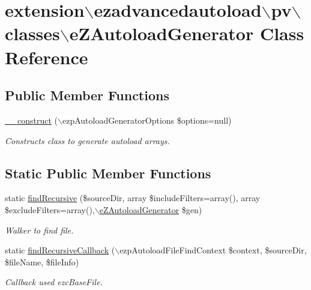 \hypertarget{classextension_1_1ezadvancedautoload_1_1pv_1_1classes_1_1e_z_autoload_generator}{\section{extension$\backslash$ezadvancedautoload$\backslash$pv$\backslash$classes$\backslash$e\-Z\-Autoload\-Generator \-Class \-Reference}
\label{classextension_1_1ezadvancedautoload_1_1pv_1_1classes_1_1e_z_autoload_generator}
}
\subsection*{\-Public \-Member \-Functions}
\begin{DoxyCompactItemize}
\item 
\hyperlink{classextension_1_1ezadvancedautoload_1_1pv_1_1classes_1_1e_z_autoload_generator_ae74a5ac61349b54be1777fda45022161}{\-\_\-\-\_\-construct} ($\backslash$ezp\-Autoload\-Generator\-Options \$options=null)
\begin{DoxyCompactList}\small\item\em \-Constructs class to generate autoload arrays. \end{DoxyCompactList}\end{DoxyCompactItemize}
\subsection*{\-Static \-Public \-Member \-Functions}
\begin{DoxyCompactItemize}
\item 
static \hyperlink{classextension_1_1ezadvancedautoload_1_1pv_1_1classes_1_1e_z_autoload_generator_a14dc03f8b1771fe4bba821f803f29b18}{find\-Recursive} (\$source\-Dir, array \$include\-Filters=array(), array \$exclude\-Filters=array(),$\backslash$\hyperlink{classextension_1_1ezadvancedautoload_1_1pv_1_1classes_1_1e_z_autoload_generator}{e\-Z\-Autoload\-Generator} \$gen)
\begin{DoxyCompactList}\small\item\em \-Walker to find file. \end{DoxyCompactList}\item 
static \hyperlink{classextension_1_1ezadvancedautoload_1_1pv_1_1classes_1_1e_z_autoload_generator_a300416501317475b3468ff5862cc0835}{find\-Recursive\-Callback} ($\backslash$ezp\-Autoload\-File\-Find\-Context \$context, \$source\-Dir, \$file\-Name, \$file\-Info)
\begin{DoxyCompactList}\small\item\em \-Callback used ezc\-Base\-File. \end{DoxyCompactList}\end{DoxyCompactItemize}
